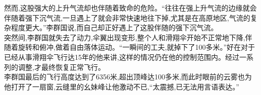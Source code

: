 然而,这股强大的上升气流却也伴随着致命的危险。``往往在强上升气流的边缘就会伴随着强下沉气流,一旦遇上了就会非常快速地往下掉,尤其是在高原地区,气流的复杂程度更大。''李群国说,而自己却正好遇上了这股伴随的强下沉气流。\\
突然间,李群国就失去了动力,伞翼出现变形,整个人和滑翔伞开始不正常地下降,伴随着旋转和俯冲,做着自由落体运动。``一瞬间的工夫,就掉下了100多米。''好在对于已经从事滑翔伞飞行达15年的他来讲,这样的情况仍在他的控制范围内。经过一系列的调整,才最终恢复正常飞行。\\
李群国最后的飞行高度达到了6356米,超出顶峰达100多米,而此时眼前的云雾也为他打开了一扇窗,云缝里的幺妹峰让他激动不已,``太震撼,已无法用言语表达。''\\



